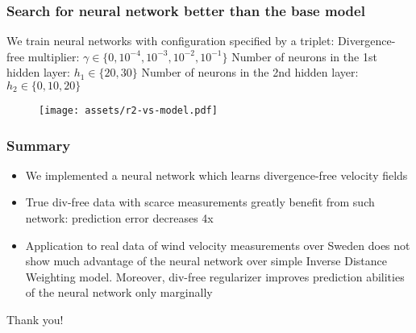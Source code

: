\documentclass{beamer}
\def\\{}%
\begin{document}
\begin{frame}
\frametitle{Search for neural network better than the base model}

We train neural networks with configuration specified by a triplet:\\
Divergence-free multiplier: $\gamma \in \{0, 10^{-4}, 10^{-3}, 10^{-2}, 10^{-1}\}$\\
Number of neurons in the 1st hidden layer: $h_1 \in \{20, 30\}$\\
Number of neurons in the 2nd hidden layer: $h_2 \in \{0, 10, 20\}$

\begin{figure}
    \centering
    \texttt{[image: assets/r2-vs-model.pdf]}
\end{figure}
\end{frame}

\begin{frame}
\frametitle{Summary}

\begin{itemize}
    \item We implemented a neural network which learns divergence-free velocity fields
    \item True div-free data with scarce measurements greatly benefit from
        such network: prediction error decreases 4x
    \item Application to real data of wind velocity measurements over Sweden
        does not show much advantage of the neural network
        over simple Inverse Distance Weighting model. Moreover, div-free
        regularizer improves prediction abilities of the neural network only
        marginally
\end{itemize}
\end{frame}

\begin{frame}[standout]
\Huge
Thank you!
\end{frame}
\end{document}

